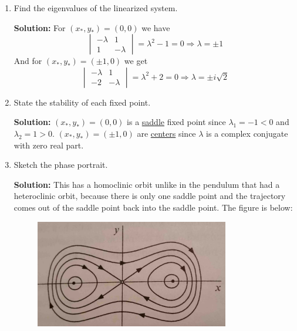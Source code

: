 \documentclass[reqno]{amsart}
\theoremstyle{definition}
\begin{document}
\begin{enumerate}
\begin{enumerate}
\item  Find the eigenvalues of the linearized system.

\textbf{Solution:  }  For $(x_*,y_*) = (0,0)$ we have
%
\begin{equation*}
\begin{vmatrix}
-\lambda & 1\\
1 & -\lambda
\end{vmatrix} = \lambda^2 -1 = 0 \Rightarrow \lambda = \pm 1
\end{equation*}
%
And for $(x_*,y_*) = (\pm 1,0)$ we get
%
\begin{equation*}
\begin{vmatrix}
-\lambda & 1\\
-2 & -\lambda
\end{vmatrix} = \lambda^2 + 2 = 0 \Rightarrow \lambda = \pm i\sqrt{2}
\end{equation*}

\item  State the stability of each fixed point.

\textbf{Solution:  }  $(x_*,y_*) = (0,0)$ is a \underline{saddle} fixed point since $\lambda_1 = -1 < 0$
and $\lambda_2 = 1 > 0$.  $(x_*,y_*) = (\pm 1,0)$ are \underline{centers} since $\lambda$ is a complex
conjugate with zero real part.

\item  Sketch the phase portrait.

\textbf{Solution:  }  This has a homoclinic orbit unlike in the pendulum that had a heteroclinic orbit, because there
is only one saddle point and the trajectory comes out of the saddle point back into the saddle point.
The figure is below:
%
\begin{figure}
\includegraphics[width = 0.8\textwidth]{ExamplePortrait}
\end{figure}

\end{enumerate}

\end{enumerate}
\end{document}
